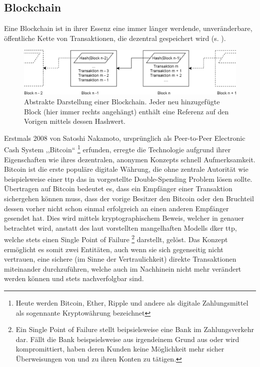 \subsection{Blockchain}
\label{sec:sota_blockchain}
    Eine Blockchain ist in ihrer Essenz eine immer länger werdende, unveränderbare, öffentliche Kette von Transaktionen, die dezentral gespeichert wird (s. ). 
    \smallskip
    \begin{figure}[H]
    	\centering
    	\includegraphics[width=\textwidth]{graphics/bc_highlvl.png}
    	\caption[Abstrakte Darstellung einer Blockchain]{Abstrakte Darstellung einer Blockchain. Jeder neu hinzugefügte Block (hier immer rechts angehängt) enthält eine Referenz auf den Vorigen mittels dessen Hashwert.}
    	\label{fig:bc_highlvl}
    \end{figure}
    \noindent Erstmals 2008 von Satoshi Nakamoto, ursprünglich als Peer-to-Peer Electronic Cash System ,,Bitcoin``
    \!\footnote{Heute werden Bitcoin, Ether, Ripple und andere als digitale Zahlungsmittel als sogennante Kryptowährung bezeichnet} 
    erfunden, erregte die Technologie aufgrund ihrer Eigenschaften wie ihres dezentralen, anonymen Konzepts schnell Aufmerksamkeit. 
    Bitcoin ist die erste populäre digitale Währung, die ohne zentrale Autorität wie beispielsweise einer \gls{ttp} das in  vorgestellte Double-Spending Problem lösen sollte\cite{Nakamoto2008}. 
    Übertragen auf Bitcoin bedeutet es, dass ein Empfänger einer Transaktion sichergehen können muss, dass der vorige Besitzer den Bitcoin oder den Bruchteil dessen vorher nicht schon einmal erfolgreich an einen anderen Empfänger gesendet hat.
    Dies wird mittels kryptographischem Beweis, welcher in  genauer betrachtet wird, anstatt des laut \citeauthor{Nakamoto2008} vorstellten mangelhaften Modells dker \gls{ttp}, welche stets einen Single Point of Failure
    \!\footnote{Ein Single Point of Failure stellt beipsielsweise eine Bank im Zahlungsverkehr dar.
    Fällt die Bank beispsielsweise aus irgendeinem Grund aus oder wird kompromittiert, haben deren Kunden keine Möglichkeit mehr sicher Überweisungen von und zu ihren Konten zu tätigen.}
    darstellt, gelöst. 
    Das Konzept ermöglicht es somit zwei Entitäten, auch wenn sie sich gegenseitig nicht vertrauen, eine sichere (im Sinne der Vertraulichkeit) direkte Transaktionen miteinander durchzuführen, welche auch im Nachhinein nicht mehr verändert werden können und stets nachverfolgbar sind.
    
